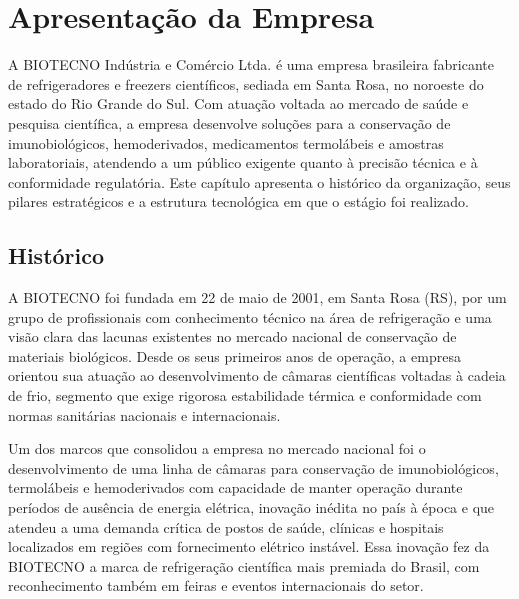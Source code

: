 
\chapter{Apresentação da Empresa}
\label{ch:apresentacao-empresa}

A BIOTECNO Indústria e Comércio Ltda. é uma empresa brasileira fabricante de refrigeradores e
freezers científicos, sediada em Santa Rosa, no noroeste do estado do Rio Grande do Sul. Com atuação
voltada ao mercado de saúde e pesquisa científica, a empresa desenvolve soluções para a conservação de
imunobiológicos, hemoderivados, medicamentos termolábeis e amostras laboratoriais, atendendo a um
público exigente quanto à precisão técnica e à conformidade regulatória. Este capítulo apresenta o
histórico da organização, seus pilares estratégicos e a estrutura tecnológica em que o estágio foi
realizado.

\section{Histórico}
\label{sec:historico}

A BIOTECNO foi fundada em 22 de maio de 2001, em Santa Rosa (RS), por um grupo de profissionais com
conhecimento técnico na área de refrigeração e uma visão clara das lacunas existentes no mercado
nacional de conservação de materiais biológicos. Desde os seus primeiros anos de operação, a empresa
orientou sua atuação ao desenvolvimento de câmaras científicas voltadas à cadeia de frio, segmento
que exige rigorosa estabilidade térmica e conformidade com normas sanitárias nacionais e internacionais.

Um dos marcos que consolidou a empresa no mercado nacional foi o desenvolvimento de uma linha de
câmaras para conservação de imunobiológicos, termolábeis e hemoderivados com capacidade de manter
operação durante períodos de ausência de energia elétrica, inovação inédita no país à época e que
atendeu a uma demanda crítica de postos de saúde, clínicas e hospitais localizados em regiões com
fornecimento elétrico instável. Essa inovação fez da BIOTECNO a marca de refrigeração científica
mais premiada do Brasil, com reconhecimento também em feiras e eventos internacionais do setor.

